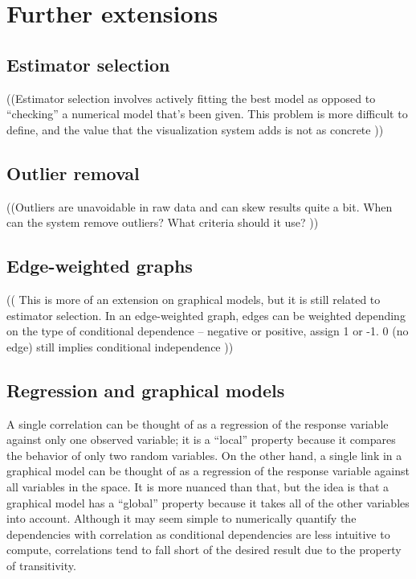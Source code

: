 \section{Further extensions}

\subsection{Estimator selection}

((Estimator selection involves actively fitting the best model as opposed to
``checking'' a numerical model that’s been given. This problem is more difficult
to define, and the value that the visualization system adds is not as concrete
))

\subsection{Outlier removal}

((Outliers are unavoidable in raw data and can skew results quite a bit. When
can the system remove outliers? What criteria should it use? ))

\subsection{Edge-weighted graphs}

(( This is more of an extension on graphical models, but it is still related to
estimator selection. In an edge-weighted graph, edges can be weighted depending
on the type of conditional dependence – negative or positive, assign 1 or -1. 0
(no edge) still implies conditional independence ))

\subsection{Regression and graphical models}

A single correlation can be thought of as a regression of the response variable
against only one observed variable; it is a ``local'' property because it
compares the behavior of only two random variables. On the other hand, a single
link in a graphical model can be thought of as a regression of the response
variable against all variables in the space. It is more nuanced than that, but
the idea is that a graphical model has a “global” property because it takes all
of the other variables into account. Although it may seem simple to numerically
quantify the dependencies with correlation as conditional dependencies are less
intuitive to compute, correlations tend to fall short of the desired result due
to the property of transitivity.

